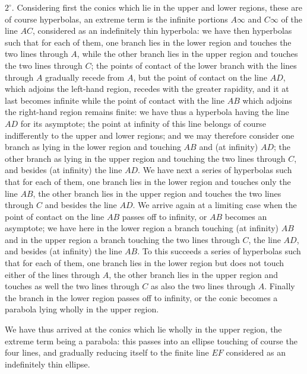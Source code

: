 \documentclass[11pt,a4paper]{book}
\begin{document}
$2^\circ$. Considering first the conics which lie in the upper and lower regions, these are of course hyperbolas, an extreme term is the infinite portions $A\infty$ and $C\infty$ of the line $AC$, considered as an indefinitely thin hyperbola: we have then hyperbolas such that for each of them, one branch lies in the lower region and touches the two lines through $A$, while the other branch lies in the upper region and touches the two lines through $C$; the points of contact of the lower branch with the lines through $A$ gradually recede from $A$, but the point of contact on the line $AD$, which adjoins the left-hand region, recedes with the greater rapidity, and it at last becomes infinite while the point of contact with the line $AB$ which adjoins the right-hand region remains finite: we have thus a hyperbola having the line $AD$ for its asymptote; the point at infinity of this line belongs of course indifferently to the upper and lower regions; and we may therefore consider one branch as lying in the lower region and touching $AB$ and (at infinity) $AD$; the other branch as lying in the upper region and touching the two lines through $C$, and besides (at infinity) the line $AD$. We have next a series of hyperbolas such that for each of them, one branch lies in the lower region and touches only the line $AB$, the other branch lies in the upper region and touches the two lines through $C$ and besides the line $AD$. We arrive again at a limiting case when the point of contact on the line $AB$ passes off to infinity, or $AB$ becomes an asymptote; we have here in the lower region a branch touching (at infinity) $AB$ and in the upper region a branch touching the two lines through $C$, the line $AD$, and besides (at infinity) the line $AB$. To this succeeds a series of hyperbolas such that for each of them, one branch lies in the lower region but does not touch either of the lines through $A$, the other branch lies in the upper region and touches as well the two lines through $C$ as also the two lines through $A$. Finally the branch in the lower region passes off to infinity, or the conic becomes a parabola lying wholly in the upper region.

We have thus arrived at the conics which lie wholly in the upper region, the extreme term being a parabola: this passes into an ellipse touching of course the four lines, and gradually reducing itself to the finite line $EF$ considered as an indefinitely thin ellipse.
\end{document}
